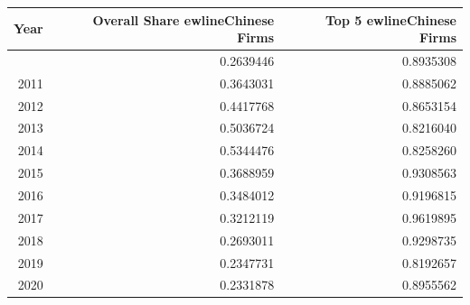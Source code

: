 \begin{table}[!t]
\fontsize{12.0pt}{14.4pt}\selectfont
\begin{tabular*}{\linewidth}{@{\extracolsep{\fill}}rrr}
\toprule
Year & Overall Share 
ewlineChinese Firms & Top 5 
ewlineChinese Firms \\ 
\midrule\addlinespace[2.5pt]
2010 & 0.2639446 & 0.8935308 \\ 
2011 & 0.3643031 & 0.8885062 \\ 
2012 & 0.4417768 & 0.8653154 \\ 
2013 & 0.5036724 & 0.8216040 \\ 
2014 & 0.5344476 & 0.8258260 \\ 
2015 & 0.3688959 & 0.9308563 \\ 
2016 & 0.3484012 & 0.9196815 \\ 
2017 & 0.3212119 & 0.9619895 \\ 
2018 & 0.2693011 & 0.9298735 \\ 
2019 & 0.2347731 & 0.8192657 \\ 
2020 & 0.2331878 & 0.8955562 \\ 
\bottomrule
\end{tabular*}
\end{table}

